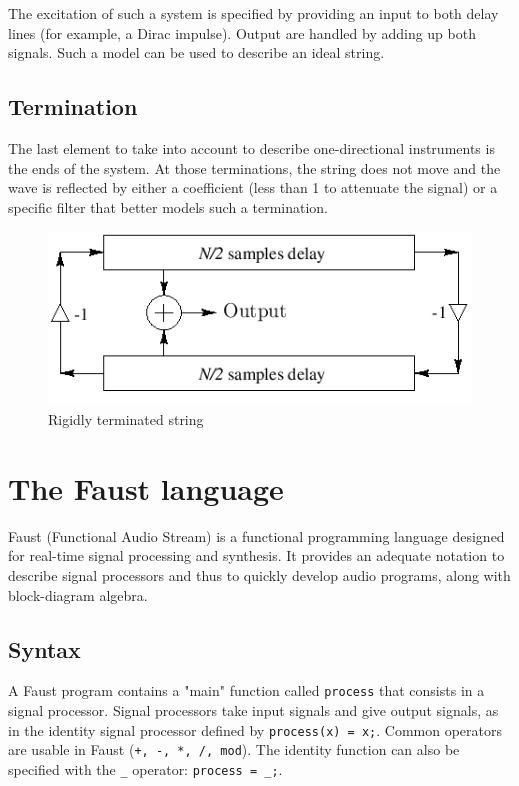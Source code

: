 \documentclass[11pt,a4paper]{article}
\begin{document}
The excitation of such a system is specified by providing an input to both delay lines (for example, a Dirac impulse). Output are handled by adding up both signals. Such a model can be used to describe an ideal string.

\subsection*{Termination}
The last element to take into account to describe one-directional instruments is the ends of the system. At those terminations, the string does not move and the wave is reflected by either a coefficient (less than 1 to attenuate the signal) or a specific filter that better models such a termination.

\begin{figure}
	\centering
	\includegraphics[scale=0.5]{pictures/terminations.png}
	\caption{Rigidly terminated string}
	\label{fig:terminations}
\end{figure}

\section{The Faust language}

Faust (Functional Audio Stream) is a functional programming \cite{quickref} language designed for real-time signal processing and synthesis. It provides an adequate notation to describe signal processors and thus to quickly develop audio programs, along with block-diagram algebra.

\subsection*{Syntax}

A Faust program contains a "main" function called \texttt{process} that consists in a signal processor.
Signal processors take input signals and give output signals, as in the identity signal processor defined by \texttt{process(x) = x;}. Common operators are usable in Faust (\texttt{+, -, *, /, mod}). The identity function can also be specified with the \texttt{\_} operator: \texttt{process = \_;}.
\end{document}
